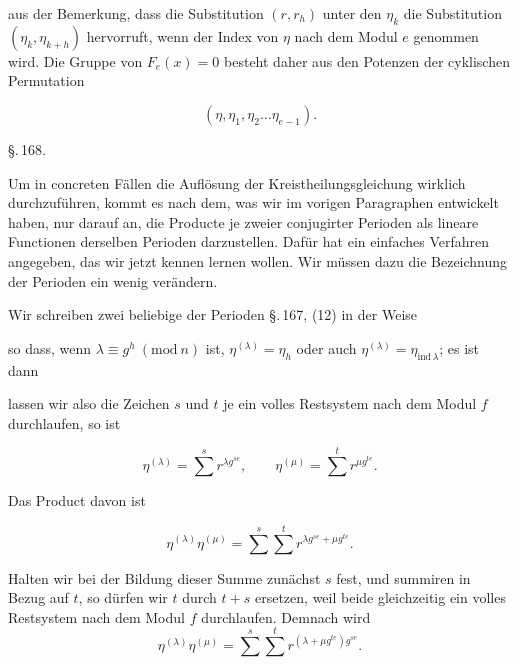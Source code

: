 aus der Bemerkung, dass die Substitution $(r, r_h)$ unter den $\eta_k$
die Substitution $(\eta_k, \eta_{k+h})$ hervorruft, wenn der Index von $\eta$
nach dem Modul $e$ genommen wird. Die Gruppe von $F_e(x) = 0$
besteht daher aus den Potenzen der cyklischen Permutation

\[
(\eta, \eta_1, \eta_2 \ldots \eta_{e-1}).
\]

\begin{center}
\S.\,168.

\end{center}

Um in concreten Fällen die Auflösung der Kreistheilungsgleichung
wirklich durchzuführen, kommt es nach dem, was wir
im vorigen Paragraphen entwickelt haben, nur darauf an, die
Producte je zweier conjugirter Perioden als lineare Functionen
derselben Perioden darzustellen. Dafür hat  ein einfaches
Verfahren angegeben, das wir jetzt kennen lernen wollen. Wir
müssen dazu die Bezeichnung der Perioden ein wenig verändern.

Wir schreiben zwei beliebige der Perioden \S.\,167, (12) in
der Weise


so dass, wenn $\lambda \equiv g^h \ (\mathrm{mod}\ n)$ ist, $\eta^{(\lambda)} = \eta_h$ oder auch
$\eta^{(\lambda)} = \eta_{\mathrm{ind}\,\lambda}$; es ist dann


lassen wir also die Zeichen $s$ und $t$ je ein volles Restsystem
nach dem Modul $f$ durchlaufen, so ist

\[
\eta^{(\lambda)} = \sum^{s} r^{\lambda g^{se}}, \qquad \eta^{(\mu)} = \sum^{t} r^{\mu g^{te}}.
\]

Das Product davon ist

\[
\eta^{(\lambda)} \eta^{(\mu)} = \sum^{s}\sum^{t} r^{\lambda g^{se} + \mu g^{te}}.
\]

Halten wir bei der Bildung dieser Summe zunächst $s$ fest,
und summiren in Bezug auf $t$, so dürfen wir $t$ durch $t + s$ ersetzen, weil beide gleichzeitig ein volles Restsystem nach dem
Modul $f$ durchlaufen. Demnach wird
\[
\eta^{(\lambda)}\eta^{(\mu)} = \sum^{s}\sum^{t} r^{(\lambda + \mu g^{te})g^{se}}.
\]
